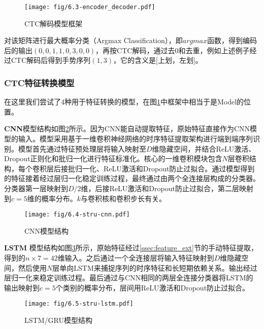\begin{figure}
    \centering
    \texttt{[image: fig/6.3-encoder\_decoder.pdf]}
    \caption{CTC解码模型框架}
    \label{fig:6.3-encoder_decoder}
\end{figure}

对该矩阵进行最大概率分类（Argmax Classification），即$argmax$函数，得到编码后的输出$(0, 0, 1, 1, 0, 3, 0, 0)$，再按CTC解码\cite{graves2006connectionist}，通过去0和去重，例如上述例子经过CTC解码后得到手势序列$(1, 3)$，它的含义是[上划，左划]。

\subsubsection{CTC特征转换模型}\label{sssec:ctc_model}

在这里我们尝试了4种用于特征转换的模型，在图\ref{fig:6.3-encoder_decoder}中框架中相当于是Model的位置。

\textbf{CNN}\hspace{5pt}模型结构如图\ref{fig:6.3-stru-cnn}所示。因为CNN能自动提取特征，原始特征直接作为CNN模型的输入。模型采用基于一维卷积神经网络的时序特征提取架构进行端到端序列识别。模型首先通过特征预处理层将输入映射至$D$维隐藏空间，并结合ReLU激活、Dropout正则化和批归一化进行特征标准化。核心的一维卷积模块包含$N$层卷积结构，每个卷积层后接批归一化、ReLU激活和Dropout防止过拟合。通过模型得到的特征接着经过层归一化稳定训练过程，最终通过由两个全连接层构成的分类器。分类器第一层映射到$D/2$维，后接ReLU激活和Dropout防止过拟合，第二层映射到$c=5$维的概率分布。$k$与卷积核和卷积步长有关。

\begin{figure}
    \centering
    \texttt{[image: fig/6.4-stru-cnn.pdf]}
    \caption{CNN模型结构}
    \label{fig:6.3-stru-cnn}
\end{figure}

\textbf{LSTM}\hspace{5pt} 模型结构如图\ref{fig:6.5-stru-lstm}所示，原始特征经过\ref{ssec:feature_ext}节的手动特征提取，得到的$n\times 7=42$维输入。之后通过一个全连接层将输入特征映射到$D$维隐藏空间，然后使用$N$层单向LSTM来捕捉序列的时序特征和长短期依赖关系。输出经过层归一化来稳定训练过程。最后通过与CNN相同的两层全连接分类器将LSTM的输出映射到$c=5$个类别的概率分布，层间用ReLU激活和Dropout防止过拟合。
\begin{figure}
    \centering
    \texttt{[image: fig/6.5-stru-lstm.pdf]}
    \caption{LSTM/GRU模型结构}
    \label{fig:6.5-stru-lstm}
\end{figure}


